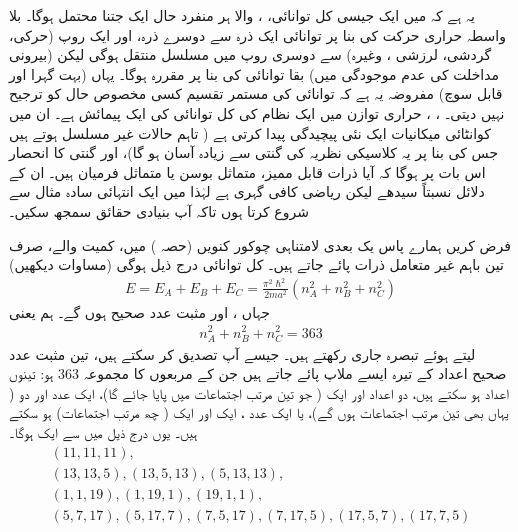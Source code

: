  یہ ہے کہ   میں ایک جیسی کل توانائی، ،  والا  ہر منفرد حال ایک جتنا محتمل ہوگا۔ بلا واسطہ حراری حرکت کی بنا پر  توانائی ایک ذرہ  سے دوسرے ذرہ، اور  ایک روپ  (حرکی، گردشی، لرزشی ، وغیرہ) سے دوسری روپ میں  مسلسل  منتقل ہوگی لیکن  (بیرونی مداخلت کی عدم موجودگی میں)  بقا  توانائی کی بنا پر   مقررہ ہوگا۔ یہاں   (بہت گہرا اور قابل سوچ) مفروضہ یہ ہے  کہ توانائی کی مستمر    تقسیم کسی مخصوص حال کو ترجیح نہیں دیتی۔ ،  ،  حراری توازن میں ایک نظام کی کل توانائی کی  ایک   پیمائش ہے۔ ان   میں کوانٹائی  میکانیات ایک نئی  پیچیدگی  پیدا کرتی ہے ( تاہم  حالات غیر مسلسل ہوتے ہیں جس  کی بنا پر   یہ  کلاسیکی نظریہ کی گنتی  سے زیادہ آسان  ہو گا)،   اور  گنتی کا   انحصار اس بات پر ہوگا کہ  آیا  ذرات قابل ممیز، متماثل بوسن یا متماثل فرمیان ہیں۔ ان کے دلائل نسبتاً سیدھے لیکن ریاضی کافی گہری ہے لہٰذا میں ایک انتہائی سادہ  مثال سے شروع کرتا   ہوں  تاکہ آپ بنیادی حقائق سمجھ سکیں۔

 
فرض کریں ہمارے پاس یک بعدی لامتناہی چوکور کنویں  (حصہ )  میں، کمیت  والے، صرف تین باہم غیر متعامل ذرات پائے جاتے ہیں۔  کل توانائی درج ذیل ہوگی (مساوات   دیکھیں)
\begin{align}
	E = E_A + E_B + E_C = \frac{\pi^2 \hslash ^2}{2ma^2}(n^2_A + n^2_B + n^2_C)
\end{align}
جہاں ،  اور  مثبت عدد صحیح ہوں گے۔ ہم  یعنی
\begin{align}
	n^2_A + n^2_B + n^2_C = 363
\end{align}  
لیتے ہوئے تبصرہ جاری رکھتے ہیں۔ جیسے آپ تصدیق کر سکتے ہیں، تین مثبت عدد صحیح اعداد کے تیرہ  ایسے ملاپ  پائے جاتے ہیں جن کے مربعوں کا مجموعہ \num{363} ہو: تینوں اعداد    ہو سکتے ہیں،  دو اعداد     اور ایک   (  جو تین مرتب اجتماعات میں پایا جائے گا)،  ایک عدد  اور دو   ( یہاں بھی تین مرتب اجتماعات  ہوں گے)،  یا ایک عدد ،  ایک  اور ایک   ( چھ مرتب اجتماعات) ہو سکتے ہیں۔ یوں   درج ذیل میں سے ایک ہوگا۔
\begin{gather*}
	(11, 11, 11),\\
	(13, 13, 5), (13, 5, 13), (5, 13, 13),\\
	(1, 1, 19), (1, 19, 1), (19, 1, 1),\\
	(5, 7, 17), (5, 17, 7), (7, 5, 17), (7, 17, 5), (17, 5, 7), (17, 7, 5)
\end{gather*}

